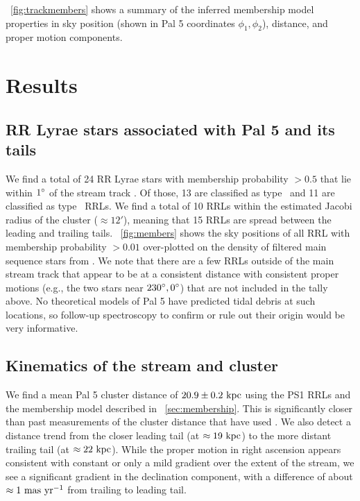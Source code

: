 \documentclass[twocolumn]{aastex63}
\begin{document}
\figurename~\ref{fig:trackmembers} shows a summary of the inferred membership model properties in sky position (shown in Pal 5 coordinates $\phi_1, \phi_2$), distance, and proper motion components.


\section{Results} \label{sec:results}

\subsection{RR Lyrae stars associated with Pal 5 and its tails}

We find a total of 24 RR Lyrae stars with membership probability $> 0.5$ that lie within $1\mbox{$^\circ$}$ of the stream track \citep[again using the track from][]{Bonaca:2019}.
Of those, 13 are classified as type \typeab\ and 11 are classified as type \typec\ RRLs.
We find a total of 10 RRLs within the estimated Jacobi radius of the cluster ($\approx 12'$), meaning that 15 RRLs are spread between the leading and trailing tails.
\figurename~\ref{fig:members} shows the sky positions of all RRL with membership probability $>0.01$ over-plotted on the density of filtered main sequence stars from \citet{Bonaca:2019}.
We note that there are a few RRLs outside of the main stream track that appear to be at a consistent distance with consistent proper motions (e.g., the two stars near $230\mbox{$^\circ$}, 0\mbox{$^\circ$}$) that are not included in the tally above.
No theoretical models of Pal 5 have predicted tidal debris at such locations, so follow-up spectroscopy to confirm or rule out their origin would be very informative.


\subsection{Kinematics of the stream and cluster}

We find a mean Pal 5 cluster distance of $20.9 \pm 0.2~\mathrm{kpc}$ using the PS1 RRLs and the membership model described in \sectionname~\ref{sec:membership}.
This is significantly closer than past measurements of the cluster distance that have used .
We also detect a distance trend from the closer leading tail (at $\approx 19~\mathrm{kpc}$) to the more distant trailing tail (at $\approx 22~\mathrm{kpc}$).
While the proper motion in right ascension appears consistent with constant or only a mild gradient over the extent of the stream, we see a significant gradient in the declination component, with a difference of about $\approx 1~\mathrm{mas}~\mathrm{yr}^{-1}$ from trailing to leading tail.
\end{document}
